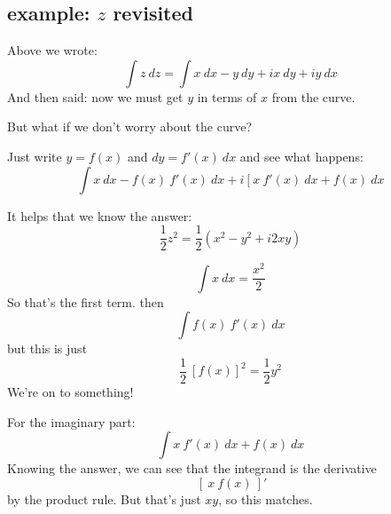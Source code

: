 \documentclass[11pt, oneside]{article}
\begin{document}
\subsection*{example: $z$ revisited}
Above we wrote:
\[ \int z \ dz = \int x \ dx - y \ dy + i x \ dy + i y \ dx \]
And then said:  now we must get $y$ in terms of $x$ from the curve.

But what if we don't worry about the curve?  

Just write $y = f(x)$ and $dy = f'(x) \ dx$ and see what happens:
\[ \int x \ dx - f(x) \ f'(x) \ dx + i \ [ \ x \  f'(x) \ dx + f(x) \ dx \]

It helps that we know the answer:
\[ \frac{1}{2} z^2 = \frac{1}{2} (x^2 - y^2 + i 2xy) \]

\[ \int x \ dx = \frac{x^2}{2} \]
So that's the first term.  then
\[ \int f(x) \ f'(x) \ dx \]
but this is just
\[ \frac{1}{2} \ [f(x)]^2 = \frac{1}{2} y^2 \]
We're on to something!

For the imaginary part:
\[ \int x \  f'(x) \ dx + f(x) \ dx \]
Knowing the answer, we can see that the integrand is the derivative
\[ \ [ \ x \ f(x) \ ]' \]
by the product rule.  But that's just $xy$, so this matches. 
\end{document}
